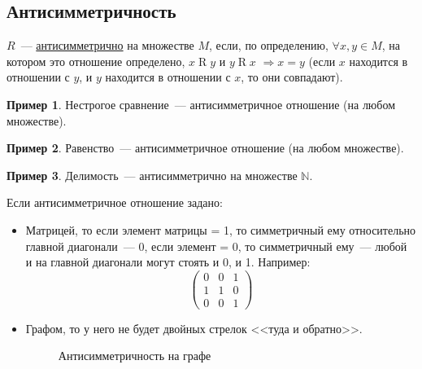 \documentclass[russian]{lecture-notes}
\theoremstyle{definition}
\newtheorem{example*}{Пример}[subsection]
\newcommand{\R}[2]{$#1\mathrel{R}#2$}
\begin{document}
\subsection{Антисимметричность}
\label{opr:antisimmetr}
\begin{definition}
	$R$~--- \underline{антисимметрично} на множестве $M$, если, по определению, $\forall x, y \in M$, на котором это отношение определено, \R{x}{y} и \R{y}{x} $\Rightarrow x=y$ (если $x$ находится в отношении с $y$, и $y$ находится в отношении с $x$, то они совпадают).
\end{definition}

\begin{example*}
	Нестрогое сравнение~--- антисимметричное отношение (на любом множестве).
\end{example*}

\begin{example*}
	Равенство~--- антисимметричное отношение (на любом множестве).
\end{example*}

\begin{example*}
	Делимость~--- антисимметрично на множестве $\mathbb{N}$.
\end{example*}

Если антисимметричное отношение задано:
\begin{itemize}
	\item Матрицей, то если элемент матрицы = 1, то симметричный ему относительно главной диагонали~--- 0, если элемент = 0, то симметричный ему~--- любой и на главной диагонали могут стоять и 0, и 1. Например:
	\begin{equation*}
	\left(
	\begin{array}{cccc}
	0 & 0 & 1\\
	1 & 1 & 0\\
	0 & 0 & 1
	\end{array}
	\right) 
	\end{equation*}
	
	\item Графом, то у него не будет двойных стрелок <<туда и обратно>>.
	\begin{figure}[H]
		\centering
		\caption{\small Антисимметричность на графе}
		\label{fig:antisimmetr}
	\end{figure}
\end{itemize}
\end{document}
